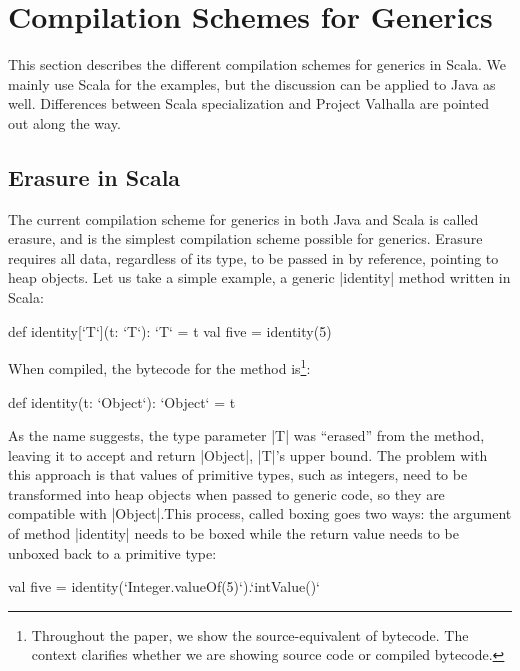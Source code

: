 \section{Compilation Schemes for Generics}
\label{sec:minibox}

This section describes the different compilation schemes for generics in Scala. We mainly use Scala for the examples, but the discussion can be applied to Java as well. Differences between Scala specialization and Project Valhalla are pointed out along the way. %

\subsection{Erasure in Scala}

The current compilation scheme for generics in both Java and Scala is called erasure, and is the simplest compilation scheme possible for generics. Erasure requires all data, regardless of its type, to be passed in by reference, pointing to heap objects. Let us take a simple example, a generic |identity| method written in Scala:

\begin{lstlisting-nobreak}
 def identity[`T`](t: `T`): `T` = t
 val five = identity(5)
\end{lstlisting-nobreak}

When compiled, the bytecode for the method is\footnote{Throughout the paper, we show the source-equivalent of bytecode. The context clarifies whether we are showing source code or compiled bytecode.}:

\begin{lstlisting-nobreak}
 def identity(t: `Object`): `Object` = t
\end{lstlisting-nobreak}

As the name suggests, the type parameter |T| was ``erased'' from the method, leaving it to accept and return |Object|, |T|'s upper bound. The problem with this approach is that values of primitive types, such as integers, need to be transformed into heap objects when passed to generic code, so they are compatible with |Object|.This process, called boxing goes two ways: the argument of method |identity| needs to be boxed while the return value needs to be unboxed back to a primitive type:

\begin{lstlisting-nobreak}
 val five = identity(`Integer.valueOf(5)`).`intValue()`
\end{lstlisting-nobreak}

